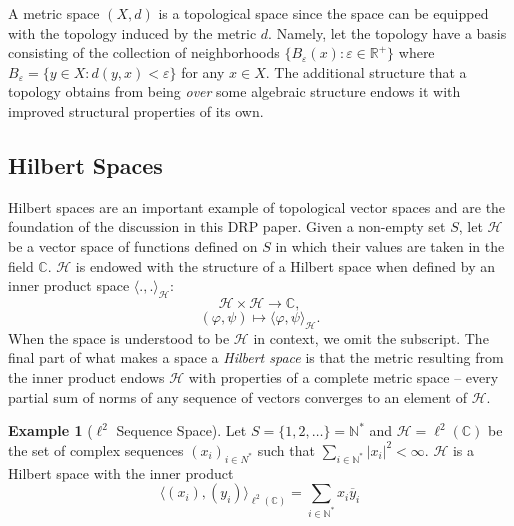 \documentclass[psamsfonts]{amsart}
\theoremstyle{definition}
\newtheorem{exmp}[thm]{Example}
\theoremstyle{remark}
\numberwithin{equation}{section}
\begin{document}
A metric space $(X, d)$ is a topological space since the space can be equipped with the topology induced by the metric $d$. Namely, let the topology have a basis consisting of the collection of neighborhoods $\{ B_{\varepsilon} (x) : \varepsilon \in \mathbb{R}^+ \}$ where $B_{\varepsilon} = \{ y \in X : d(y,x) < \varepsilon \}$ for any $x \in X$. The additional structure that a topology obtains from being \textit{over} some algebraic structure endows it with improved structural properties of its own. 

\subsection{Hilbert Spaces}
Hilbert spaces are an important example of topological vector spaces and are the foundation of the discussion in this DRP paper. Given a non-empty set $S$, let $\mathcal{H}$ be a vector space of functions defined on $S$ in which their values are taken in the field $\mathbb{C}$. $\mathcal{H}$ is endowed with the structure of a Hilbert space when defined by an inner product space $\langle . , . \rangle _{\mathcal{H}}:$
$$\mathcal{H} \times \mathcal{H} \rightarrow \mathbb{C},$$
$$(\varphi, \psi ) \mapsto \langle \varphi, \psi \rangle _{\mathcal{H}}. $$
When the space is understood to be $\mathcal{H}$ in context, we omit the subscript. The final part of what makes a space a \textit{Hilbert space} is that the metric resulting from the inner product endows $\mathcal{H}$ with properties of a complete metric space -- every partial sum of norms of any sequence of vectors converges to an element of $\mathcal{H}$. 

\begin{exmp}[$\ell^2$ Sequence Space]
Let $S = \{ 1, 2, \dots \} = \mathbb{N}^*$ and $\mathcal{H} = \ell ^2 (\mathbb{C})$ be the set of complex sequences $(x_i)_{i \in N^*}$ such that $\sum _{i \in \mathbb{N}^*} |x_i|^2 < \infty.$ $\mathcal{H}$ is a Hilbert space with the inner product 
$$\langle (x_i), (y_i) \rangle _{\ell ^2 (\mathbb{C})} = \sum _{i \in \mathbb{N}^*} x_i \overline{y} _i $$
\end{exmp}
\end{document}
